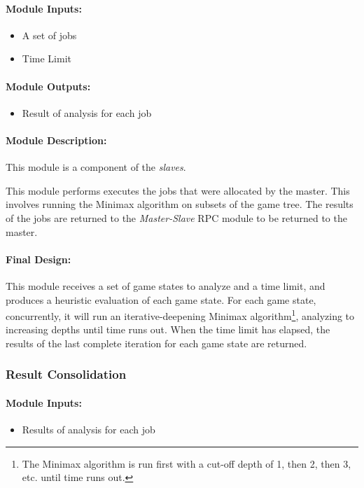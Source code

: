 \documentclass[pdftex,12pt,a4paper]{article}
\begin{document}
\paragraph{Module Inputs:}
\begin{itemize}
\item A set of jobs
\item Time Limit
\end{itemize}

\paragraph{Module Outputs:}
\begin{itemize}
\item Result of analysis for each job
\end{itemize}

\paragraph{Module Description:\\}
This module is a component of the \emph{slaves}.

This module performs executes the jobs that were allocated by the master. This involves running the Minimax algorithm on subsets of the game tree. The results of the jobs are returned to the \emph{Master-Slave} RPC module to be returned to the master.

\paragraph{Final Design:\\}
This module receives a set of game states to analyze and a time limit, and produces a heuristic evaluation of each game state. For each game state, concurrently, it will run an iterative-deepening Minimax algorithm\footnote{The Minimax algorithm is run first with a cut-off depth of 1, then 2, then 3, etc. until time runs out.}, analyzing to increasing depths until time runs out. When the time limit has elapsed, the results of the last complete iteration for each game state are returned.


\subsubsection{Result Consolidation}

\paragraph{Module Inputs:}
\begin{itemize}
\item Results of analysis for each job
\end{itemize}
\end{document}
